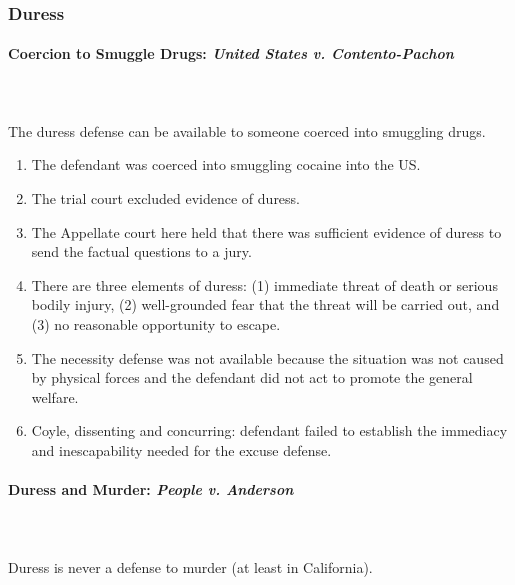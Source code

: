 \subsubsection{Duress}

\paragraph{Coercion to Smuggle Drugs: \emph{United States v. Contento-Pachon}}
~\\\\
The duress defense can be available to someone coerced into smuggling drugs.

\begin{enumerate}
    \item The defendant was coerced into smuggling cocaine into the US. 
    \item The trial court excluded evidence of duress.
    \item The Appellate court here held that there was sufficient evidence of 
    duress to send the factual questions to a jury.
    \item There are three elements of duress: (1) immediate threat of death or 
    serious bodily injury, (2) well-grounded fear that the threat will be 
    carried out, and (3) no reasonable opportunity to escape.
    \item The necessity defense was not available because the situation was 
    not caused by physical forces and the defendant did not act to promote the 
    general welfare.
    \item Coyle, dissenting and concurring: defendant failed to establish the 
    immediacy and inescapability needed for the excuse defense.
\end{enumerate}

\paragraph{Duress and Murder: \emph{People v. Anderson}}
~\\\\
Duress is never a defense to murder (at least in California).

